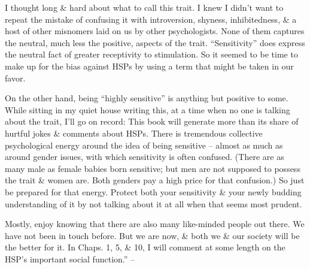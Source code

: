 \documentclass{article}
\numberwithin{equation}{section}
\begin{document}
I thought long \& hard about what to call this trait. I knew I didn't want to repeat the mistake of confusing it with introversion, shyness, inhibitedness, \& a host of other misnomers laid on us by other psychologists. None of them captures the neutral, much less the positive, aspects of the trait. ``Sensitivity'' does express the neutral fact of greater receptivity to stimulation. So it seemed to be time to make up for the bias against HSPs by using a term that might be taken in our favor.

On the other hand, being ``highly sensitive'' is anything but positive to some. While sitting in my quiet house writing this, at a time when no one is talking about the trait, I'll go on record: This book will generate more than its share of hurtful jokes \& comments about HSPs. There is tremendous collective psychological energy around the idea of being sensitive -- almost as much as around gender issues, with which sensitivity is often confused. (There are as many male as female babies born sensitive; but men are not supposed to possess the trait \& women are. Both genders pay a high price for that confusion.) So just be prepared for that energy. Protect both your sensitivity \& your newly budding understanding of it by not talking about it at all when that seems most prudent.

Mostly, enjoy knowing that there are also many like-minded people out there. We have not been in touch before. But we are now, \& both we \& our society will be the better for it. In Chaps. 1, 5, \& 10, I will comment at some length on the HSP's important social function.'' -- \cite[pp. 29--30]{Aron2013}
\end{document}
